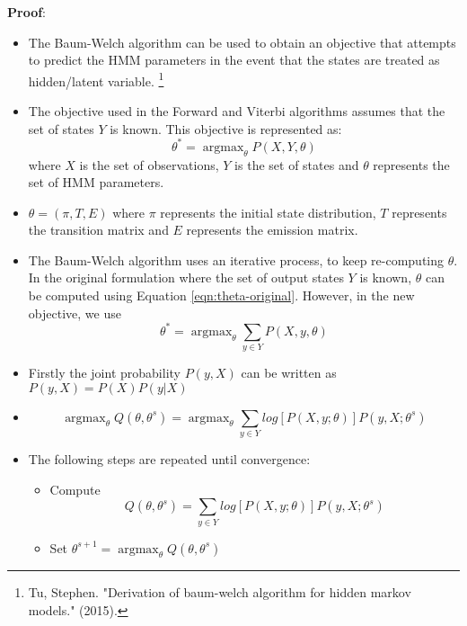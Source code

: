 \documentclass[parskip=half]{scrartcl}
\DeclareMathOperator*{\argmax}{argmax}
\begin{document}
    \textbf{Proof}:
    \begin{itemize}
        \item 
        The Baum-Welch algorithm can be used to obtain an objective that attempts to predict the HMM parameters in the event that the states are treated as hidden/latent variable. \footnote{Tu, Stephen. "Derivation of baum-welch algorithm for hidden markov models." (2015).}
        \item 
        The objective used in the Forward and Viterbi algorithms assumes that the set of states $Y$ is known. This objective is represented as:
        \begin{equation} \label{eqn:theta-original}
            \theta^* = \argmax_{\theta} P(X, Y, \theta)
        \end{equation}
        where $X$ is the set of observations, $Y$ is the set of states and $\theta$ represents the set of HMM parameters.
        \item 
        $\theta = (\pi, T, E)$ where $\pi$ represents the initial state distribution, $T$ represents the transition matrix and $E$ represents the emission matrix.
        \item 
        The Baum-Welch algorithm uses an iterative process, to keep re-computing $\theta$. In the original formulation where the set of output states $Y$ is known, $\theta$ can be computed using Equation \ref{eqn:theta-original}. However, in the new objective, we use
        \begin{equation*}
            \theta^* = \argmax_{\theta} \sum_{y \in Y} P(X, y, \theta)
        \end{equation*}
        \item 
        Firstly the joint probability $P(y,X)$ can be written as $P(y,X) = P(X) P(y|X)$
        \item 
        $$\argmax_\theta Q(\theta, \theta^s) = \argmax_\theta \sum_{y \in Y} log [P(X,y;\theta)] P(y,X;\theta^s) $$ 
        \item 
        The following steps are repeated until convergence:
        \begin{itemize}
            \item 
            Compute 
            \begin{equation} \label{eqn:q-1}
                Q(\theta, \theta^s) = \sum_{y \in Y} log [P(X,y;\theta)] P(y,X;\theta^s)
            \end{equation}
            \item 
            Set $\theta^{s+1} = \argmax_\theta Q(\theta, \theta^s)$

\end{itemize}
\end{itemize}
\end{document}
